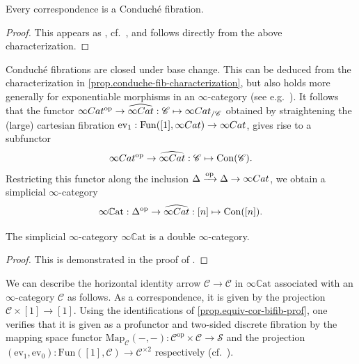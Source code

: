 \documentclass[a4paper, 11pt]{amsart}
\numberwithin{theorem}{section}
\theoremstyle{definition}
\newcommand{\cat}[1]{\textup{#1}}
\newcommand{\op}{\mathrm{op}}
\newcommand{\map}{\mathrm{Map}}
\newcommand{\fun}{\mathrm{Fun}}
\newcommand{\Cat}{\cat{Cat}}
\renewcommand{\S}{\mathscr{S}}
\newcommand{\C}{\mathscr{C}}
\newcommand{\ev}{\mathrm{ev}}
\newcommand{\Con}{\mathrm{Con}}
\newcommand{\CCAT}{\mathbb{C}\mathrm{at}}
\begin{document}
\begin{corollary}
	Every correspondence is a Conduch\'e fibration.
\end{corollary}
\begin{proof}
	This appears as \cite[Corollary 1.13]{AyalaFrancis}, cf.\ \cite[Example B.3.10]{HA}, and follows directly from the above characterization. 
\end{proof}






\begin{construction}\label{constr.ccat}
Conduch\'e fibrations are closed under base change. This can be deduced from the characterization in \cref{prop.conduche-fib-characterization}, 
but also holds more generally for exponentiable morphisms in an $\infty$-category (see e.g.\ \cite[Corollary 2.7]{Comp}). 
It follows that the functor
$
\infty\Cat^\op \rightarrow \widehat{\infty\Cat} : \C \mapsto \infty\Cat_{/\C}
$
obtained by straightening the (large) cartesian fibration $\ev_1 : \fun([1], \infty\Cat) \rightarrow \infty\Cat$, 
gives rise to a subfunctor 
$$
\infty\Cat^\op \rightarrow \widehat{\infty\Cat} : \C \mapsto \Con(\C).
$$
Restricting this functor along the inclusion $\Delta \xrightarrow{\op} \Delta \rightarrow \infty\Cat$,
we obtain a simplicial $\infty$-category
$$
\infty\CCAT : \Delta^\op \rightarrow \widehat{\infty\Cat} : [n] \mapsto \Con([n]).
$$
\end{construction}


\begin{proposition}
	The simplicial $\infty$-category $\infty\CCAT$ is a double $\infty$-category.
\end{proposition}
\begin{proof}
	This is demonstrated  in the proof of \cite[Corollary 1.25]{AyalaFrancis}.
\end{proof}

\begin{example}\label{ex.ccat-hor-identities}
	We can describe the horizontal identity arrow $\C \rightarrow \C$ in $\infty\CCAT$ associated with an $\infty$-category $\C$ as follows. As a correspondence, 
	it is given by the projection $\C \times [1] \rightarrow [1]$. Using the identifications of \cref{prop.equiv-cor-bifib-prof}, one verifies that it is given as a profunctor 
	and two-sided discrete fibration by 
	the mapping space functor $\map_\C(-,-) : \C^\op \times \C \rightarrow \S$ and the projection $(\ev_1, \ev_0) : \fun([1], \C) \rightarrow \C^{\times 2}$ respectively (cf.\ \cite[Example 4.3]{AyalaFrancis}).
\end{example}
\end{document}
